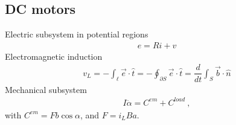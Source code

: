 \documentclass[letterpaper,10pt,english]{jupyterBook}
\begin{document}
\sphinxstepscope


\subsection{DC motors}
\label{\detokenize{ch/systems-electromechanic-motor-dc:dc-motors}}\label{\detokenize{ch/systems-electromechanic-motor-dc:classical-electromagnetism-systems-electromechanic-examples-dc-motor}}\label{\detokenize{ch/systems-electromechanic-motor-dc::doc}}
\sphinxAtStartPar
Electric subsystem in potential regions
\begin{equation*}
\begin{split}e = R i + v\end{split}
\end{equation*}
\sphinxAtStartPar
Electromagnetic induction
\begin{equation*}
\begin{split}v_L = -\int_{\ell} \vec{e} \cdot \hat{t} = - \oint_{\partial S} \vec{e} \cdot \hat{t} = \dfrac{d}{dt}\int_{S} \vec{b} \cdot \hat{n} \end{split}
\end{equation*}
\sphinxAtStartPar
Mechanical sub\sphinxhyphen{}system
\begin{equation*}
\begin{split}I \ddot{\alpha} = C^{em} + C^{load} \ ,\end{split}
\end{equation*}
\sphinxAtStartPar
with \(C^{em} = F b \cos \alpha\), and \(F = i_L B a\).
\end{document}
